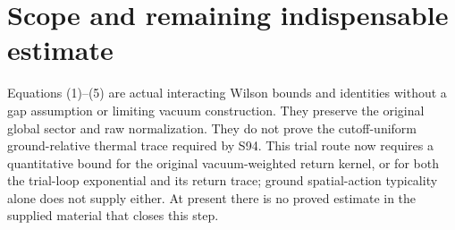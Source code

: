 \documentclass{article}
\begin{document}
\section*{Scope and remaining indispensable estimate}
Equations (1)--(5) are actual interacting Wilson bounds and identities without a gap assumption or limiting vacuum construction. They preserve the original global sector and raw normalization. They do not prove the cutoff-uniform ground-relative thermal trace required by S94. This trial route now requires a quantitative bound for the original vacuum-weighted return kernel, or for both the trial-loop exponential and its return trace; ground spatial-action typicality alone does not supply either. At present there is no proved estimate in the supplied material that closes this step.
\end{document}
